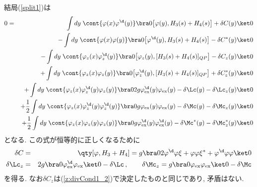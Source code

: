 \documentclass[10.5pt,a4paper]{jreport}
\begin{document}
結局(\ref{split1})は
\begin{eqnarray}
  0&=& \int d{y}\; \cont{\varphi(x)\varphi^\d(y)} \bra0 \bigl[\varphi   (y), H_3(s) + H_4(s)\bigr] + \delta C  (y) \ket0 \notag\\
  &&- \int d{y}\; \cont{\varphi(x)\varphi   (y)} \bra0 \bigl[\varphi^\d(y), H_3(s) + H_4(s)\bigr] - \delta C^*(y) \ket0 \notag\\
  &&- \int d{y}\; \cont{\varphi_{z}(x)\varphi_{z}^\d(y)} 
  \bra0 \bigl[\varphi_{z}   (y), [H_3(s) + H_4(s)]_{QP}\bigr] - \delta C_{z}  (y)\ket0 \notag\\
  &&+ \int d{y}\; \cont{\varphi_{z}(x)\varphi_{z}   (y)} 
  \bra0 \bigl[\varphi_{z}^\d(y), [H_3(s) + H_4(s)]_{QP}\bigr] + \delta C_{z}^*(y)\ket0 \notag\\
  &&+ \int d{y}\; \cont{\varphi_{z}(x)\varphi_{z}^\d(y)\varphi_{z}(y)}
  \bra0 2g \varphi_{\rm ex}^\d(y) \varphi_{\rm ex}(y) - \delta\Lc(y)-\delta\Lc_{z}(y) \ket0	\notag\\
  &&+ \frac12\int d{y}\; \cont{\varphi_{z}(x)\varphi_{z}^\d(y)\varphi_{z}^\d(y)}
  \bra0 g \varphi_{\rm ex}(y) \varphi_{\rm ex}(y) - \delta\Mc(y)-\delta\Mc_{z}(y) \ket0 \notag\\
  &&+ \frac12\int d{y}\; \cont{\varphi_{z}(x)\varphi_{z}   (y)\varphi_{z}   (y)}
  \bra0 g \varphi_{\rm ex}^\d(y) \varphi_{\rm ex}^\d(y) - \delta\Mc^*(y)-\delta\Mc_{z}^*(y) \ket0
\end{eqnarray}
となる. この式が恒等的に正しくなるために
\begin{eqnarray}
  \label{z:deltaC}
  \delta C &=& \qty[\varphi, H_3 + H_4] = g\bra0 2\varphi^\d \varphi\xi + \varphi\varphi\xi^* + \varphi^\d\varphi\varphi \ket0 \\
  \label{z:detaLMz}
  \delta\Lc_{z} &=& 2g \bra0 \varphi_{\rm ex}^\d\varphi_{\rm ex} \ket0 - \delta \Lc \,,\qquad
  \delta\Mc_{z} = g \bra0 \varphi_{\rm ex}\varphi_{\rm ex} \ket0 - \delta \Mc 
\end{eqnarray}
を得る. なお$\delta C_{z}$は(\ref{z:divCond1_2})で決定したものと同じであり, 矛盾はない.
\end{document}
